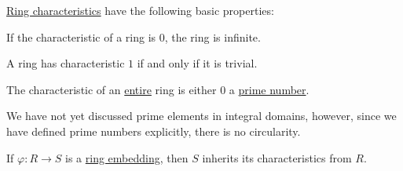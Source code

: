 \begin{proposition}\label{thm:def:ring_characteristic}
  \hyperref[def:ring_characteristic]{Ring characteristics} have the following basic properties:
  \begin{thmenum}
     If the characteristic of a ring is \( 0 \), the ring is infinite.

     A ring has characteristic \( 1 \) if and only if it is trivial.

     The characteristic of an \hyperref[def:entire_semiring]{entire} ring is either \( 0 \) a \hyperref[def:prime_number]{prime number}.

    We have not yet discussed prime elements in integral domains, however, since we have defined prime numbers explicitly, there is no circularity.

     If \( \varphi: R \to S \) is a \hyperref[def:ring/morphism]{ring embedding}, then \( S \) inherits its characteristics from \( R \).
  \end{thmenum}
\end{proposition}
